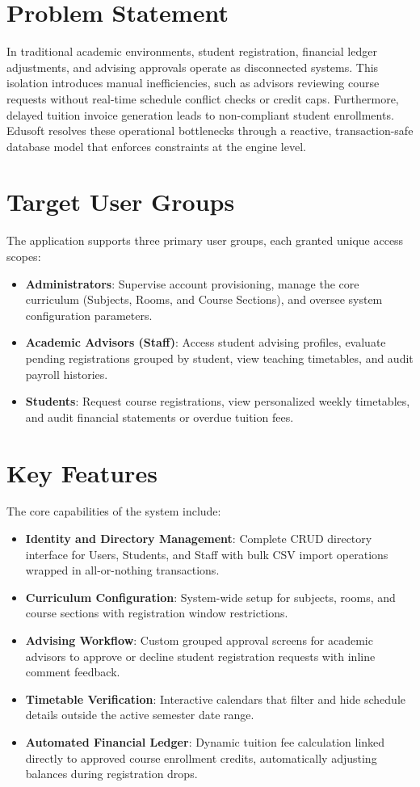 \documentclass[12pt,a4paper]{report}
\begin{document}
\section{Problem Statement}
In traditional academic environments, student registration, financial ledger adjustments, and advising approvals operate as disconnected systems. This isolation introduces manual inefficiencies, such as advisors reviewing course requests without real-time schedule conflict checks or credit caps. Furthermore, delayed tuition invoice generation leads to non-compliant student enrollments. Edusoft resolves these operational bottlenecks through a reactive, transaction-safe database model that enforces constraints at the engine level.

\section{Target User Groups}
The application supports three primary user groups, each granted unique access scopes:
\begin{itemize}
    \item \textbf{Administrators}: Supervise account provisioning, manage the core curriculum (Subjects, Rooms, and Course Sections), and oversee system configuration parameters.
    \item \textbf{Academic Advisors (Staff)}: Access student advising profiles, evaluate pending registrations grouped by student, view teaching timetables, and audit payroll histories.
    \item \textbf{Students}: Request course registrations, view personalized weekly timetables, and audit financial statements or overdue tuition fees.
\end{itemize}

\section{Key Features}
The core capabilities of the system include:
\begin{itemize}
    \item \textbf{Identity and Directory Management}: Complete CRUD directory interface for Users, Students, and Staff with bulk CSV import operations wrapped in all-or-nothing transactions.
    \item \textbf{Curriculum Configuration}: System-wide setup for subjects, rooms, and course sections with registration window restrictions.
    \item \textbf{Advising Workflow}: Custom grouped approval screens for academic advisors to approve or decline student registration requests with inline comment feedback.
    \item \textbf{Timetable Verification}: Interactive calendars that filter and hide schedule details outside the active semester date range.
    \item \textbf{Automated Financial Ledger}: Dynamic tuition fee calculation linked directly to approved course enrollment credits, automatically adjusting balances during registration drops.
\end{itemize}
\end{document}
